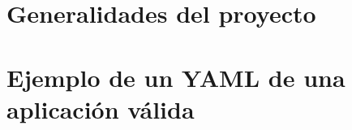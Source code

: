 \documentclass[12pt, oneside]{book}
\begin{document}
    
    

    

    

    \renewcommand{\contentsname}{\normalsize Contenido}
    \tableofcontents
    \newpage

    \renewcommand{\listfigurename}{\normalsize Lista de figuras}
    \listoffigures
    
    \renewcommand{\listtablename}{\normalsize Lista de tablas}    
    \listoftables
    \mainmatter


    

    \chapter{Generalidades del proyecto}
    
    

    

    

    

    
    
    
    

    \newpage
    
    
    
    \appendix
    \newpage
    \chapter{Ejemplo de un YAML de una aplicación válida}\label{appendix:example}
    

\end{document}
